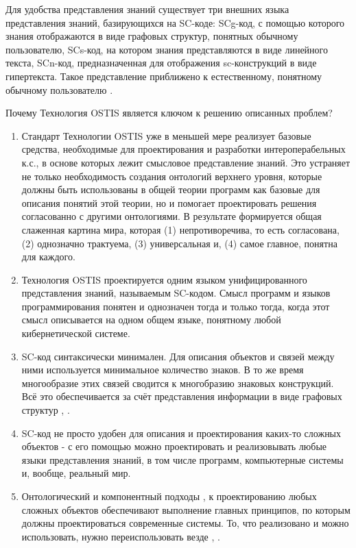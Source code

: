 Для удобства представления знаний существует три внешних языка представления знаний, базирующихся на SC-коде: SCg-код, с помощью которого знания отображаются в виде графовых структур, понятных обычному пользователю, SCs-код, на котором знания представляются в виде линейного текста, SCn-код, предназначенная для отображения sc-конструкций в виде гипертекста. Такое представление приближено к естественному, понятному обычному пользователю \cite{Standard2021}.

Почему Технология OSTIS является ключом к решению описанных проблем?
\begin{enumerate}
    \item {Стандарт Технологии OSTIS \cite{Standard2021} уже в меньшей мере реализует базовые средства, необходимые для проектирования и разработки интероперабельных к.с., в основе которых лежит смысловое представление знаний. Это устраняет не только необходимость создания онтологий верхнего уровня, которые должны быть использованы в общей теории программ как базовые для описания понятий этой теории, но и помогает проектировать решения согласованно с другими онтологиями. В результате формируется общая слаженная картина мира, которая (1) непротиворечива, то есть согласована, (2) однозначно трактуема, (3) универсальная и, (4) самое главное, понятна для каждого.}
    \item {Технология OSTIS проектируется одним языком унифицированного представления знаний, называемым SC-кодом. Смысл программ и языков программирования понятен и однозначен тогда и только тогда, когда этот смысл описывается на одном общем языке, понятному любой кибернетической системе.}
    \item {SC-код синтаксически минимален. Для описания объектов и связей между ними используется минимальное количество знаков. В то же время многообразие этих связей сводится к многобразию знаковых конструкций. Всё это обеспечивается за счёт представления информации в виде графовых структур \cite{Kasyanov2003}, \cite{Petrov1978}.}
    \item {SC-код не просто удобен для описания и проектирования каких-то сложных объектов - с его помощью можно проектировать и реализовывать любые языки представления знаний, в том числе программ, компьютерные системы и, вообще, реальный мир.}
    \item {Онтологический и компонентный подходы \cite{Sales2022}, \cite{Samaa2020} к проектированию любых сложных объектов обеспечивают выполнение главных принципов, по которым должны проектироваться современные системы. То, что реализовано и можно использовать, нужно переиспользовать везде \cite{O4IS2007}, \cite{Molorodov2019}.}
\end{enumerate}

